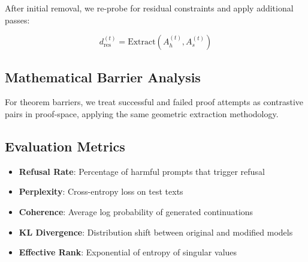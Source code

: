 After initial removal, we re-probe for residual constraints and apply additional passes:

\begin{equation}
d_{\text{res}}^{(t)} = \text{Extract}(A_h^{(t)}, A_s^{(t)})
\end{equation}

\subsection{Mathematical Barrier Analysis}

For theorem barriers, we treat successful and failed proof attempts as contrastive pairs in proof-space, applying the same geometric extraction methodology.

\subsection{Evaluation Metrics}

\begin{itemize}
    \item \textbf{Refusal Rate}: Percentage of harmful prompts that trigger refusal
    \item \textbf{Perplexity}: Cross-entropy loss on test texts
    \item \textbf{Coherence}: Average log probability of generated continuations
    \item \textbf{KL Divergence}: Distribution shift between original and modified models
    \item \textbf{Effective Rank}: Exponential of entropy of singular values
\end{itemize}
